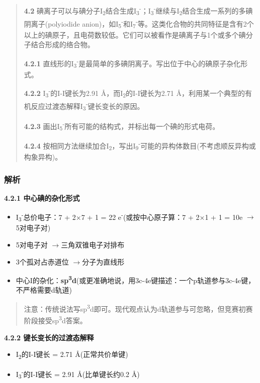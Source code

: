 \documentclass[a4paper,11pt]{ctexart}
\providecommand{\tightlist}{\setlength{\itemsep}{0pt}\setlength{\parskip}{0pt}}
\newcommand{\箭}{\ensuremath{\rightarrow}}
\newcommand{\左箭}{\ensuremath{\leftarrow}}
\newcommand{\上箭}{\ensuremath{\uparrow}}
\newcommand{\下箭}{\ensuremath{\downarrow}}
\newcommand{\衡}{\ensuremath{\rightleftharpoons}}
\newcommand{\双箭}{\ensuremath{\leftrightarrow}}
\newcommand{\约等于}{\ensuremath{\approx}}
\newcommand{\小于等于}{\ensuremath{\leq}}
\newcommand{\大于等于}{\ensuremath{\geq}}
\newcommand{\不等于}{\ensuremath{\neq}}
\newcommand{\西格马}{\ensuremath{\sigma}}
\newcommand{\派}{\ensuremath{\pi}}
\begin{document}
\begin{quote}
\textbf{4.2} 碘离子可以与碘分子I\textsubscript{2}结合生成I\textsubscript{3}\textsuperscript{-}；I\textsubscript{3}\textsuperscript{-}继续与I\textsubscript{2}结合生成一系列的多碘阴离子(polyiodide anion)，如I\textsubscript{5}\textsuperscript{-}和I\textsubscript{7}\textsuperscript{-}等。这类化合物的共同特征是含有2个以上的碘原子，且电荷数较低。它们可以被看作是碘离子与1个或多个碘分子结合形成的络合物。

\textbf{4.2.1} 直线形的I\textsubscript{3}\textsuperscript{-}是最简单的多碘阴离子。写出位于中心的碘原子杂化形式。

\textbf{4.2.2} I\textsubscript{3}\textsuperscript{-}的I-I键长为2.91 Å，而I\textsubscript{2}的I-I键长为2.71 Å，利用某一个典型的有机反应过渡态解释I\textsubscript{3}\textsuperscript{-}键长变长的原因。

\textbf{4.2.3} 画出I\textsubscript{5}\textsuperscript{-}所有可能的结构式，并标出每一个碘的形式电荷。

\textbf{4.2.4} 按相同方法继续加合I\textsubscript{2}，写出I\textsubscript{9}\textsuperscript{-}可能的异构体数目(不考虑顺反异构或构象异构)。
\end{quote}

\subsubsection{解析}\label{ux89e3ux6790-1}

\textbf{4.2.1 中心碘的杂化形式}

\begin{itemize}
\tightlist
\item
  I\textsubscript{3}\textsuperscript{-}总价电子：7 + 2×7 + 1 = 22 e\textsuperscript{-}(或按中心原子算：7 + 2×1 + 1 = 10e \箭 5对电子对)
\item
  5对电子对 \箭 三角双锥电子对排布
\item
  3个孤对占赤道位 \箭 分子为直线形
\item
  中心I的杂化：\textbf{sp\textsuperscript{3}d}(或更准确地说，用3c-4e键描述：一个p轨道参与3c-4e键，不严格需要d轨道)
\end{itemize}

\begin{quote}
注意：传统说法写sp\textsuperscript{3}d即可。现代观点认为d轨道参与可忽略，但竞赛初赛阶段接受sp\textsuperscript{3}d答案。
\end{quote}

\textbf{4.2.2 键长变长的过渡态解释}

\begin{itemize}
\tightlist
\item
  I\textsubscript{2}的I-I键长 = 2.71 Å(正常共价单键)
\item
  I\textsubscript{3}\textsuperscript{-}的I-I键长 = 2.91 Å(比单键长约0.2 Å)
\end{itemize}
\end{document}
